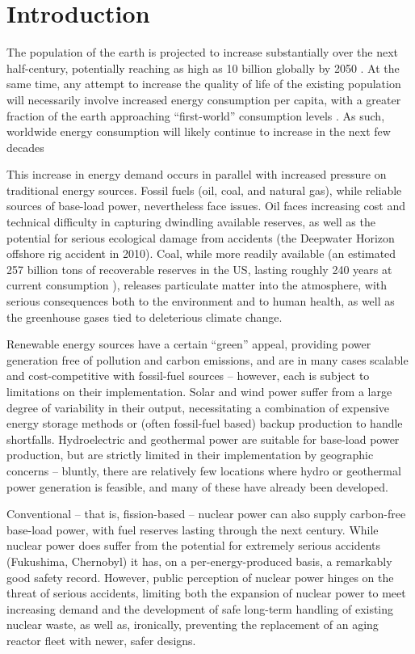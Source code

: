 \chapter{Introduction}\label{ch:Introduction}

The population of the earth is projected to increase substantially over the next half-century, potentially reaching as high as 10 billion globally by 2050 \cite{World2010}.  At the same time, any attempt to increase the quality of life of the existing population will necessarily involve increased energy consumption per capita, with a greater fraction of the earth approaching ``first-world'' consumption levels \cite{HDI2011}.  As such, worldwide energy consumption will likely continue to increase in the next few decades \cite{EIA2011,BP2010}

This increase in energy demand occurs in parallel with increased pressure on traditional energy sources.  Fossil fuels (oil, coal, and natural gas), while reliable sources of base-load power, nevertheless face issues.  Oil faces increasing cost and technical difficulty in capturing dwindling available reserves, as well as the potential for serious ecological damage from accidents (\eg the Deepwater Horizon offshore rig accident in 2010).  Coal, while more readily available (an estimated 257 billion tons of recoverable reserves in the US, lasting roughly 240 years at current consumption \cite{BP2010,EIA2013}), releases particulate matter into the atmosphere, with serious consequences both to the environment and to human health, as well as the greenhouse gases tied to deleterious climate change.  

Renewable energy sources have a certain ``green'' appeal, providing power generation free of pollution and carbon emissions, and are in many cases scalable and cost-competitive with fossil-fuel sources -- however, each is subject to limitations on their implementation.  Solar and wind power suffer from a large degree of variability in their output, necessitating a combination of expensive energy storage methods or (often fossil-fuel based) backup production to handle shortfalls.  Hydroelectric and geothermal power are suitable for base-load power production, but are strictly limited in their implementation by geographic concerns -- bluntly, there are relatively few locations where hydro or geothermal power generation is feasible, and many of these have already been developed.

Conventional -- that is, fission-based -- nuclear power can also supply carbon-free base-load power, with fuel reserves lasting through the next century.  While nuclear power does  suffer from the potential for extremely serious accidents (Fukushima, Chernobyl) it has, on a per-energy-produced basis, a remarkably good safety record.  However, public perception of nuclear power hinges on the threat of serious accidents, limiting both the expansion of nuclear power to meet increasing demand and the development of safe long-term handling of existing nuclear waste, as well as, ironically, preventing the replacement of an aging reactor fleet with newer, safer designs.

